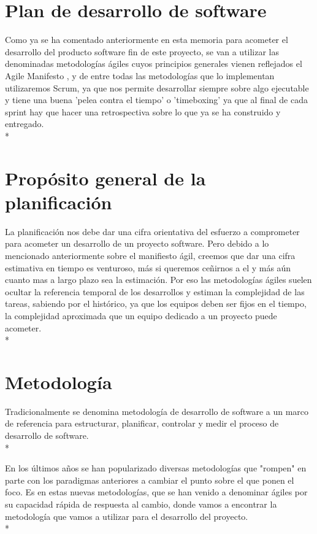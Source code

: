 \documentclass[../pfc.tex]{subfiles}
\begin{document}
	
	\section{Plan de desarrollo de software}
	
	Como ya se ha comentado anteriormente en esta memoria para acometer el desarrollo del producto software fin de este proyecto, se van a utilizar las denominadas metodologías ágiles cuyos principios generales vienen reflejados el Agile Manifesto \cite{agile}, y de entre todas las metodologías que lo implementan utilizaremos Scrum, ya que nos permite desarrollar siempre sobre algo ejecutable y tiene una buena 'pelea contra el tiempo' o 'timeboxing' ya que al final de cada sprint hay que hacer una retrospectiva sobre lo que ya se ha construido y entregado.\\*

	\section{Propósito general de la planificación}
	
	La planificación nos debe dar una cifra orientativa del esfuerzo a comprometer para acometer un desarrollo de un proyecto software. Pero debido a lo mencionado anteriormente sobre el manifiesto ágil, creemos que dar una cifra estimativa en tiempo es venturoso, más si queremos ceñirnos a el y más aún cuanto mas a largo plazo sea la estimación. Por eso las metodologías ágiles suelen ocultar la referencia temporal de los desarrollos y estiman la complejidad de las tareas, sabiendo por el histórico, ya que los equipos deben ser fijos en el tiempo, la complejidad aproximada que un equipo dedicado a un proyecto puede acometer.\\*
	
	\section{Metodología }
	
	Tradicionalmente se denomina metodología de desarrollo de software a un marco de referencia para estructurar, planificar, controlar y medir el proceso de desarrollo de software.\cite{wiki-metodologia}\\*
	
	En los últimos años se han popularizado diversas metodologías que "rompen" en parte con los paradigmas anteriores a cambiar el punto sobre el que ponen el foco. Es en estas nuevas metodologías, que se han venido a denominar ágiles por su capacidad rápida de respuesta al cambio, donde vamos a encontrar la metodología que vamos a utilizar para el desarrollo del proyecto.\\*
	
\end{document}
